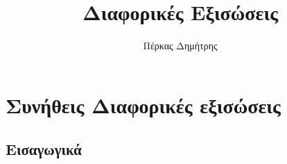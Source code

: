 \documentclass[12pt,a4paper]{article}
\begin{document}
\title{Διαφορικές Εξισώσεις}
\author{Πέρκας Δημήτρης}

\maketitle

\pagebreak


\tableofcontents
\newpage




\section{Συνήθεις Διαφορικές εξισώσεις}

\subsection{Εισαγωγικά}
\end{document}

